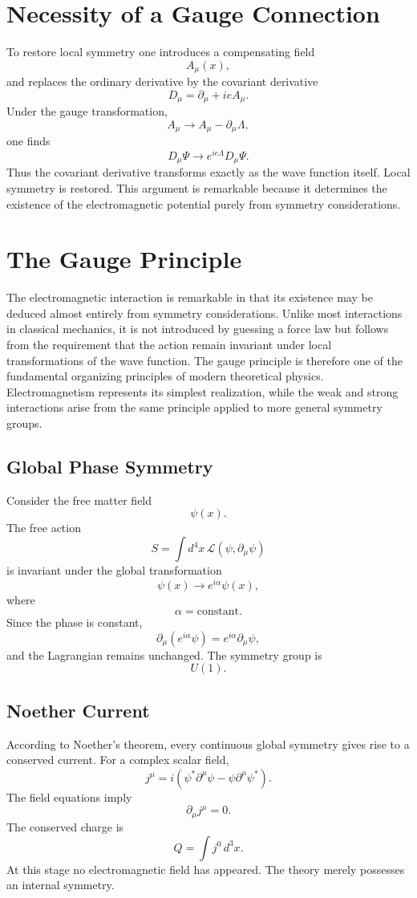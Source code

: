 \section{Necessity of a Gauge Connection}
To restore local symmetry one introduces a compensating field
\[A_\mu(x),\]
and replaces the ordinary derivative by the covariant derivative
\[\boxed{D_\mu=\partial_\mu+ieA_\mu.}\]
Under the gauge transformation,
\[\boxed{A_\mu\rightarrow A_\mu-\partial_\mu\Lambda,}\]
one finds
\[D_\mu\Psi\rightarrow e^{ie\Lambda}D_\mu\Psi.\]
Thus the covariant derivative transforms exactly as the wave function
itself.
Local symmetry is restored.
This argument is remarkable because it determines the existence of the
electromagnetic potential purely from symmetry considerations.
\section{The Gauge Principle}
The electromagnetic interaction is remarkable in that its existence may
be deduced almost entirely from symmetry considerations. Unlike most
interactions in classical mechanics, it is not introduced by guessing a
force law but follows from the requirement that the action remain
invariant under local transformations of the wave function.
The gauge principle is therefore one of the fundamental organizing
principles of modern theoretical physics. Electromagnetism represents
its simplest realization, while the weak and strong interactions arise
from the same principle applied to more general symmetry groups.
\subsection{Global Phase Symmetry}
Consider the free matter field
\[\psi(x).\]
The free action
\[S=\int d^4x\,\mathcal L(\psi,\partial_\mu\psi)\]
is invariant under the global transformation
\[\boxed{\psi(x)\rightarrow e^{i\alpha}\psi(x),}\]
where
\[\alpha=\mathrm{constant}.\]
Since the phase is constant,
\[\partial_\mu (e^{i\alpha}\psi) =e^{i\alpha}\partial_\mu\psi,\]
and the Lagrangian remains unchanged.
The symmetry group is
\[U(1).\]
\subsection{Noether Current}
According to Noether's theorem,
every continuous global symmetry gives rise to a conserved current.
For a complex scalar field,
\[\boxed{j^\mu=i\left(\psi^*\partial^\mu\psi-\psi\partial^\mu\psi^*\right).}\]
The field equations imply
\[\boxed{\partial_\mu j^\mu=0.}\]
The conserved charge is
\[Q=\int j^0\,d^3x.\]
At this stage no electromagnetic field has appeared.
The theory merely possesses an internal symmetry.
